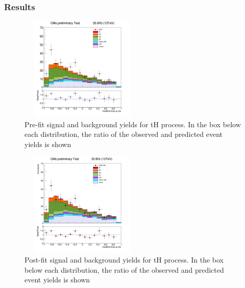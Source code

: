 \documentclass[11pt]{beamer}
\begin{document}
\begin{frame}
\frametitle{Results}
\begin{minipage}{0.5\textwidth}
	\begin{center}
	\begin{figure}
		\includegraphics[width=6cm,height=5cm]{figures/kin.png}
		\caption*{\tiny{Pre-fit signal and background yields for tH process. In the
			box below each distribution, the ratio of the observed and predicted event yields is shown}}
	\end{figure}
\end{center}
\end{minipage}\hfill
\begin{minipage}{0.5\textwidth}
	\begin{center}
	\begin{figure}
		\includegraphics[width=6cm,height=5cm]{figures/simple.png}
		\caption*{\tiny{Post-fit signal and background yields for tH process. In the
			box below each distribution, the ratio of the observed and predicted event yields is shown}}
	\end{figure}
\end{center}
\end{minipage}
\end{frame}
\end{document}
